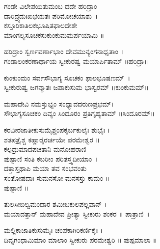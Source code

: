 ಗಂಡೇ ವಿಲೇಪಯಿತುಮಂಬ ದದೇ ಹರಿದ್ರಾಂ\\ ದಾರಿದ್ರ್ಯದುಃಖಭಯತಃ ಪರಿಮೋಚಯಾಶು~।\\
ಕಸ್ತೂರಿಕಾತಿಲಕಭೂಷಿತಫಾಲದೇಶೇ \\ಮಾಂಗಲ್ಯಸೂಚಕಸುಕುಂಕುಮಮರ್ಪಯಾಮಿ ॥

ಹರಿದ್ರಾಂ ಸ್ವರ್ಣವರ್ಣಾಭಾಂ ದೇವಮುನ್ಯಂಗನಾಧೃತಾಂ~।\\ಗಂಡಾಲಂಕರಣಾರ್ಥಾಯ ಸ್ವೀಕುರಷ್ವ ಮಯಾರ್ಪಿತಾಮ್ ॥ಹರಿದ್ರಾ॥

ಕುಂಕುಂಮಂ ಸರ್ವಸೌಭಾಗ್ಯ ಸೂಚಕಂ ಫಾಲಭೂಷಣಮ್~।\\ ಸ್ವೀಕುರುಷ್ವ ಜಗನ್ಮಾತಃ ಜಪಾಕುಸುಮ ಭಾಸ್ವರಮ್ ॥ಕುಂಕುಮಮ್॥

ಮಹಾದೇವಿ ನಮಸ್ತುಭ್ಯಂ ಸಂಧ್ಯಾವದರುಣಪ್ರಭಮ್।\\ಸೌಭಾಗ್ಯಸೂಚಕಂ ದಿವ್ಯಂ ಸಿಂದೂರಂ ಪ್ರತಿಗೃಹ್ಯತಾಮ್ ॥ಸಿಂದೂರಮ್॥

ಕರವೀರಜಾತೀಕುಸುಮೈಶ್ಚಂಪಕೈರ್ಬಕುಲೈಃ ಶುಭೈಃ ।\\
ಶತಪತ್ರೈಶ್ಚ ಕಹ್ಲಾರೈರರ್ಚಯೇ ಪರಮೇಶ್ವರ ॥\\
ಕಲ್ಪದ್ರುಮಾದಪಚಿತಾನಿ ಮನೋಹರಾಣಿ \\ಪುಷ್ಪಾಣಿ ಸಂತಿ ಕಬರೀಂ ಪರಿತಸ್ತ್ವದೀಯಾಂ~।\\
ದತ್ತಾಸ್ತಥಾಪಿ ಮಯಾ ತವ ಸಂಭವಂತು \\ಸಂತೋಷದಾಃ ಸುಮನಸೋ ಮನಸಸ್ತು ಕಾಮಂ ॥\\
ಪುಷ್ಪಾಣಿ ॥

ತುಲಸೀಬಿಲ್ವಮಂದಾರ ಶಮೀಬಕುಲಪಲ್ಲವಾನ್ ।\\
ಮಯಾದತ್ತಾನ್ ಮಹಾದೇವ ಪ್ರೀತ್ಯಾ ಸ್ವೀಕುರು ಶಂಕರ ॥ ಪಾತ್ರಾಣಿ ॥

ಮಲ್ಲಿಕಾಜಾತಿಕುಸುಮೈಃ ಚಂಪಕಾಗಿರಿಕರ್ಣಿಕೈಃ ।\\
ದಿವ್ಯಗಂಧಾಮಿಮಾಂ ಮಾಲಾಂ ಸ್ವೀಕುರು ಪರಮೇಶ್ವರಿ ॥ ಪುಷ್ಪಮಾಲಾ ॥



